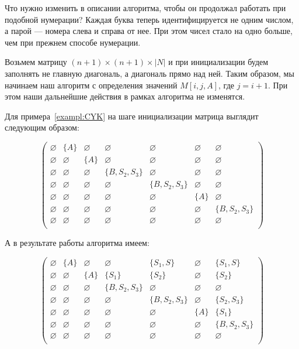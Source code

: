 Что нужно изменить в описании алгоритма, чтобы он продолжал работать при подобной нумерации? Каждая буква теперь идентифицируется не одним числом, а парой --- номера слева и справа от нее. При этом чисел стало на одно больше, чем при прежнем способе нумерации.

Возьмем матрицу  $(n + 1) \times (n + 1) \times  |N|$ и при инициализации будем заполнять не главную диагональ, а диагональ прямо над ней. Таким образом, мы начинаем наш алгоритм с определения значений $M[i, j, A] \text{, где } j = i + 1$. При этом наши дальнейшие действия в рамках алгоритма не изменятся.

Для примера~\ref{exampl:CYK} на шаге инициализации матрица выглядит следующим образом:

\[
\begin{pmatrix}
\varnothing & \{A\}       & \varnothing & \varnothing    & \varnothing    & \varnothing & \varnothing    \\
\varnothing & \varnothing & \{A\}     & \varnothing    & \varnothing      & \varnothing & \varnothing    \\
\varnothing & \varnothing & \varnothing & \{B, S_2, S_3\} & \varnothing       & \varnothing & \varnothing    \\
\varnothing & \varnothing & \varnothing & \varnothing    & \{B, S_2, S_3\} & \varnothing & \varnothing   \\
\varnothing & \varnothing & \varnothing & \varnothing    & \varnothing    & \{A\}       & \varnothing    \\
\varnothing & \varnothing & \varnothing & \varnothing    & \varnothing    & \varnothing & \{B, S_2, S_3\} \\
\varnothing & \varnothing & \varnothing & \varnothing    & \varnothing    & \varnothing & \varnothing    \\

\end{pmatrix}
\]

А в результате работы алгоритма имеем:

\[
\begin{pmatrix}
\varnothing & \{A\}       & \varnothing & \varnothing    & \{S_1, S\}     & \varnothing & \{S_1, S\}     \\
\varnothing & \varnothing & \{A\}       & \{S_1\}        & \{S_2\}            & \varnothing & \{S_2\}        \\
\varnothing & \varnothing & \varnothing & \{B, S_2, S_3\} & \varnothing       & \varnothing & \varnothing    \\
\varnothing & \varnothing & \varnothing & \varnothing    & \{B, S_2, S_3\} & \varnothing & \{S_2, S_3\}  \\
\varnothing & \varnothing & \varnothing & \varnothing    & \varnothing    & \{A\}       & \{S_1\}            \\
\varnothing & \varnothing & \varnothing & \varnothing    & \varnothing    & \varnothing & \{B, S_2, S_3\} \\
\varnothing & \varnothing & \varnothing & \varnothing    & \varnothing    & \varnothing & \varnothing    \\
\end{pmatrix}
\]

